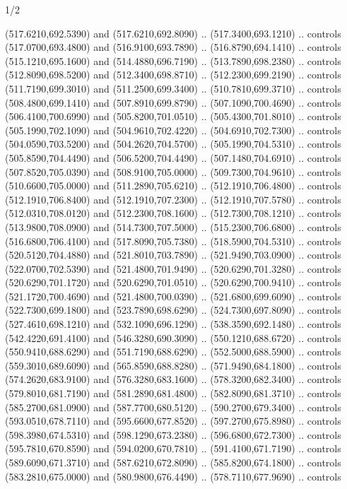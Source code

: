 \begin{flagdescription}{1/2}
\begin{scope}[xshift=0.5\flaglength]
\begin{scope}[scale=0.00745\flagwidth,xshift=-12.1mm,yshift=41.7mm]
\begin{scope}[y=0.80pt, x=0.80pt, yscale=-1, xscale=1, inner sep=0pt, outer sep=0pt]
\begin{scope}[cm={{1.33333,0.0,0.0,-1.33333,(0.0,114.66667)}}]
\begin{scope}[scale=0.100]
  (517.6210,692.5390) and (517.6210,692.8090) .. (517.3400,693.1210) .. controls
  (517.0700,693.4800) and (516.9100,693.7890) .. (516.8790,694.1410) .. controls
  (515.1210,695.1600) and (514.4880,696.7190) .. (513.7890,698.2380) .. controls
  (512.8090,698.5200) and (512.3400,698.8710) .. (512.2300,699.2190) .. controls
  (511.7190,699.3010) and (511.2500,699.3400) .. (510.7810,699.3710) .. controls
  (508.4800,699.1410) and (507.8910,699.8790) .. (507.1090,700.4690) .. controls
  (506.4100,700.6990) and (505.8200,701.0510) .. (505.4300,701.8010) .. controls
  (505.1990,702.1090) and (504.9610,702.4220) .. (504.6910,702.7300) .. controls
  (504.0590,703.5200) and (504.2620,704.5700) .. (505.1990,704.5310) .. controls
  (505.8590,704.4490) and (506.5200,704.4490) .. (507.1480,704.6910) .. controls
  (507.8520,705.0390) and (508.9100,705.0000) .. (509.7300,704.9610) .. controls
  (510.6600,705.0000) and (511.2890,705.6210) .. (512.1910,706.4800) .. controls
  (512.1910,706.8400) and (512.1910,707.2300) .. (512.1910,707.5780) .. controls
  (512.0310,708.0120) and (512.2300,708.1600) .. (512.7300,708.1210) .. controls
  (513.9800,708.0900) and (514.7300,707.5000) .. (515.2300,706.6800) .. controls
  (516.6800,706.4100) and (517.8090,705.7380) .. (518.5900,704.5310) .. controls
  (520.5120,704.4880) and (521.8010,703.7890) .. (521.9490,703.0900) .. controls
  (522.0700,702.5390) and (521.4800,701.9490) .. (520.6290,701.3280) .. controls
  (520.6290,701.1720) and (520.6290,701.0510) .. (520.6290,700.9410) .. controls
  (521.1720,700.4690) and (521.4800,700.0390) .. (521.6800,699.6090) .. controls
  (522.7300,699.1800) and (523.7890,698.6290) .. (524.7300,697.8090) .. controls
  (527.4610,698.1210) and (532.1090,696.1290) .. (538.3590,692.1480) .. controls
  (542.4220,691.4100) and (546.3280,690.3090) .. (550.1210,688.6720) .. controls
  (550.9410,688.6290) and (551.7190,688.6290) .. (552.5000,688.5900) .. controls
  (559.3010,689.6090) and (565.8590,688.8280) .. (571.9490,684.1800) .. controls
  (574.2620,683.9100) and (576.3280,683.1600) .. (578.3200,682.3400) .. controls
  (579.8010,681.7190) and (581.2890,681.4800) .. (582.8090,681.3710) .. controls
  (585.2700,681.0900) and (587.7700,680.5120) .. (590.2700,679.3400) .. controls
  (593.0510,678.7110) and (595.6600,677.8520) .. (597.2700,675.8980) .. controls
  (598.3980,674.5310) and (598.1290,673.2380) .. (596.6800,672.7300) .. controls
  (595.7810,670.8590) and (594.0200,670.7810) .. (591.4100,671.7190) .. controls
  (589.6090,671.3710) and (587.6210,672.8090) .. (585.8200,674.1800) .. controls
  (583.2810,675.0000) and (580.9800,676.4490) .. (578.7110,677.9690) .. controls

\end{scope}
\end{scope}
\end{scope}
\end{scope}
\end{scope}
\end{flagdescription}
